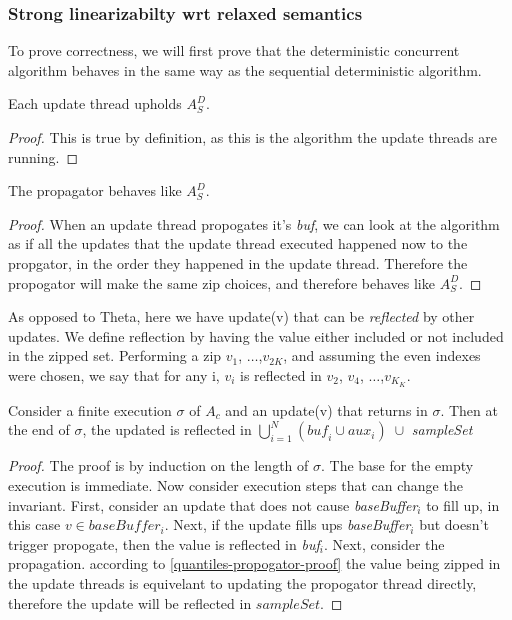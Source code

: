 \subsubsection{Strong linearizabilty wrt relaxed semantics}
To prove correctness, we will first prove that the deterministic concurrent algorithm behaves in the same way
as the sequential deterministic algorithm.

\begin{claim}
	Each update thread upholds $A_S^D$.
\end{claim}

\begin{proof}
This is true by definition, as this is the algorithm the update threads are running.
\end{proof}

\begin{claim} \label{quantiles-propogator-proof}
	The propagator behaves like $A_S^D$.
\end{claim}

\begin{proof}
	When an update thread propogates it's \emph{buf}, we can look at the algorithm as if all the updates
	that the update thread executed happened now to the propgator, in the order they happened in the update thread.
	Therefore the propogator will make the same zip choices, and therefore behaves like $A_S^D$.
\end{proof}

As opposed to Theta, here we have update(v) that can be \emph{reflected} by other updates. We define reflection
by having the value either included or not included in the zipped set. Performing a zip 
{$v_1$, $\dots$,$v_{2K}$}, and assuming the even indexes were chosen,
 we say that for any i, $v_i$ is reflected in  {$v_2$, $v_4$, $\dots$,$v_{K_K}$}.

\begin{invariant}
	Consider a finite execution $\sigma$ of  $A_c$ and an update(v) that returns in $\sigma$. 
Then at the end of $\sigma$, the updated is reflected in 
$\bigcup_{i=1}^N (\mathit{buf_i} \cup \mathit{aux_i}) \; \cup$ \emph{sampleSet}
\end{invariant}

\begin{proof}
	The proof is by induction on the length of $\sigma$. The base for the empty execution is immediate. 
	Now consider execution steps that can change the invariant.
	First, consider an update that does not cause \emph{baseBuffer}$_i$ to fill up, in this case $v \in baseBuffer_i$.
	Next, if the update fills ups \emph{baseBuffer}$_i$ but doesn't trigger  propogate, then the value is reflected
	in \emph{buf}$_i$.
	Next, consider the propagation. according to \ref{quantiles-propogator-proof} the value being zipped in
	the update threads is equivelant to updating the propogator thread directly, therefore the update will be
	reflected in $sampleSet$.
\end{proof}

